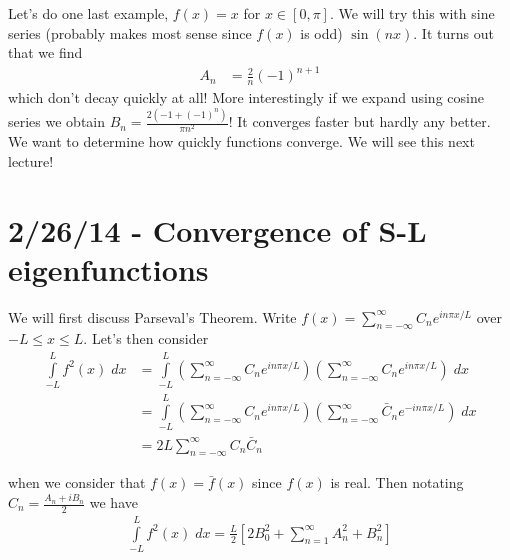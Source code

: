 \documentclass[10pt]{report}
\begin{document}
Let's do one last example, $f(x) = x$ for $x \in [0,\pi]$. We will try this with sine series (probably makes most sense since $f(x)$ is odd) $\sin (nx)$. It turns out that we find
\begin{align}
    A_n &= \frac{2}{n}\left( -1 \right)^{n+1}
\end{align}
which don't decay quickly at all! More interestingly if we expand using cosine series we obtain $B_n = \frac{2(-1 + (-1)^n)}{\pi n^2}$! It converges faster but hardly any better. We want to determine how quickly functions converge. We will see this next lecture!
\chapter{2/26/14 - Convergence of S-L eigenfunctions}

We will first discuss Parseval's Theorem. Write $f(x) = \sum_{n=-\infty}^{\infty}C_ne^{in\pi x/L}$ over $-L \leq x \leq L$. Let's then consider
\begin{align}
    \displaystyle\int\limits_{-L}^{L}f^2(x)\;dx &= \displaystyle\int\limits_{-L}^{L}\left( \sum_{n=-\infty}^{\infty}C_ne^{in\pi x/L} \right)\left( \sum_{n=-\infty}^{\infty}C_ne^{in\pi x/L} \right)\;dx\\
    &= \displaystyle\int\limits_{-L}^{L}\left( \sum_{n=-\infty}^{\infty}C_ne^{in\pi x/L} \right)\left( \sum_{n=-\infty}^{\infty}\bar{C}_ne^{-in\pi x/L} \right)\;dx\\
    &= 2L\sum_{n=-\infty}^{\infty}C_n\bar{C}_n
\end{align}

when we consider that $f(x) = \bar{f}(x)$ since $f(x)$ is real. Then notating $C_n = \frac{A_n + iB_n}{2}$ we have
\begin{align}
    \displaystyle\int\limits_{-L}^{L}f^2(x)\;dx = \frac{L}{2}\left[ 2B_0^2 + \sum_{n=1}^{\infty}A_n^2 + B_n^2 \right]
\end{align}
\end{document}
